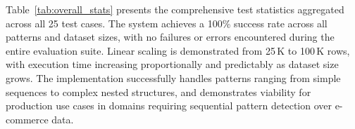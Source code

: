 Table~\ref{tab:overall_stats} presents the comprehensive test
statistics aggregated across all 25 test cases.  The system achieves
a 100\% success rate across all patterns and dataset sizes, with no
failures or errors encountered during the entire evaluation suite.
Linear scaling is demonstrated from 25\,K to 100\,K rows, with
execution time increasing proportionally and predictably as dataset
size grows.  The implementation successfully handles patterns ranging
from simple sequences to complex nested structures, and demonstrates
viability for production use cases in domains requiring sequential
pattern detection over e-commerce data.

